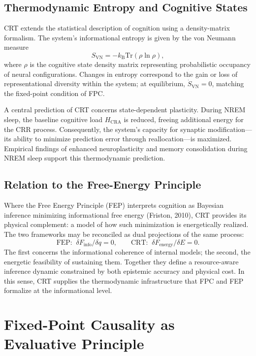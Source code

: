 \documentclass[12pt,a4paper]{article}
\begin{document}
\subsection{Thermodynamic Entropy and Cognitive States}

CRT extends the statistical description of cognition using a density-matrix formalism.  The system’s informational entropy is given by the von Neumann measure
\begin{equation}
S_{\mathrm{VN}}=-k_{\mathrm{B}}\mathrm{Tr}(\rho\ln\rho),
\end{equation}
where \(\rho\) is the cognitive state density matrix representing probabilistic occupancy of neural configurations.  Changes in entropy correspond to the gain or loss of representational diversity within the system; at equilibrium, \(\dot{S}_{\mathrm{VN}}=0\), matching the fixed-point condition of FPC.

A central prediction of CRT concerns state-dependent plasticity.  During NREM sleep, the baseline cognitive load \(H_{\mathrm{CRA}}\) is reduced, freeing additional energy for the CRR process.  Consequently, the system’s capacity for synaptic modification—its ability to minimize prediction error through reallocation—is maximized.  Empirical findings of enhanced neuroplasticity and memory consolidation during NREM sleep support this thermodynamic prediction.

\subsection{Relation to the Free-Energy Principle}

Where the Free Energy Principle (FEP) interprets cognition as Bayesian inference minimizing informational free energy (Friston, 2010), CRT provides its physical complement: a model of how such minimization is energetically realized.  The two frameworks may be reconciled as dual projections of the same process:
\[
\text{FEP:}\;\;\delta F_{\text{info}}/\delta q = 0,
\qquad
\text{CRT:}\;\;\delta F_{\text{energy}}/\delta E = 0.
\]
The first concerns the informational coherence of internal models; the second, the energetic feasibility of sustaining them.  Together they define a resource-aware inference dynamic constrained by both epistemic accuracy and physical cost.  In this sense, CRT supplies the thermodynamic infrastructure that FPC and FEP formalize at the informational level.

\section{Fixed-Point Causality as Evaluative Principle}
\end{document}
